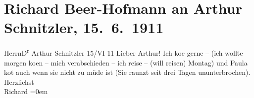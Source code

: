 

         
         \renewcommand{\erwaehntePersonen}{Personen: Paula Beer-Hofmann}
         \renewcommand{\erwaehnteOrte}{Orte: Wien}
         \renewcommand{\erwaehnteWerke}{}
               \section[Richard Beer-Hofmann an Arthur Schnitzler, 15. 6. 1911]{ Richard Beer-Hofmann an Arthur Schnitzler, 15. 6. 1911}\nopagebreak{}\rehead{ }\begin{ledgroupsized}[t]{13cm}\normalsize\beginnumbering \toendnotes[C]{\smallbreak\pagebreak[2]} 
\pstart{}{\pb}Herrn\pend{}\pstart{}D\textsuperscript{r} Arthur Schnitzler\pend{}{\bigskip}\pstart
           \raggedleft{}{\pb}15/VI 11\pend
           \pstart
           Lieber Arthur! Ich ko{\geminationm}e gerne – (ich
               wollte morgen ko{\geminationm}en – mich verabschieden – ich reise –
               (will reisen) Montag) und Paula
                  ko{\geminationm}t auch wenn sie nicht zu müde ist (Sie raunzt seit
               drei Tagen ununterbrochen).\pend
           \pstart
           Herzlichst{\\[\baselineskip]}\spacefill\mbox{Richard}\pend
           \leftskip=0em{}
         
         \endnumbering{}\end{ledgroupsized}  \newcommand{\dateiname}{L02023}\newcommand{\titel}{Richard Beer-Hofmann an Arthur Schnitzler, 15. 6. 1911}\newcommand{\editorInnen}{Martin Anton Müller und Gerd-Hermann Susen}
      